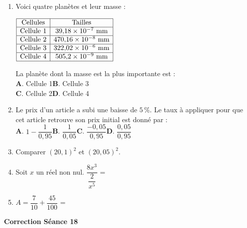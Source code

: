 \documentclass[a4paper,11pt]{article}
\begin{document}
\begin{seanceD}{} %

\begin{enumerate}
\item Voici quatre planètes et leur masse : \\
\begin{minipage}[c]{0.4\textwidth}
$\renewcommand{\arraystretch}{1}
\begin{array}{|c|c|}
\hline
 \text{Cellules} & \text{Tailles}\\
\hline
 \text{Cellule 1} & 39{,}18\times 10^{-7}\text{ mm}\\
\hline
\text{Cellule 2} & 470{,}16\times 10^{-8}\text{ mm}\\
\hline
\text{Cellule 3} & 322{,}02\times 10^{-6}\text{ mm}\\
\hline
\text{Cellule 4} & 505{,}2\times 10^{-9}\text{ mm}\\
\hline
 \end{array}
\renewcommand{\arraystretch}{1}$
\end{minipage} \hfill  \begin{minipage}[c]{0.6\textwidth}
La planète dont la masse est la plus importante est : \\
\textbf{A}. Cellule 1\qquad \textbf{B}. Cellule 3\\
\textbf{C}. Cellule 2\qquad \textbf{D}. Cellule 4\qquad 

\end{minipage}
\item Le prix d’un article a subi une baisse de $5\,\%$. Le taux à appliquer pour que cet article retrouve son prix initial est donné par  :\\
\textbf{A}. $1-\dfrac{1}{0{,}95}$\qquad \textbf{B}. $\dfrac{1}{0{,}05}$\qquad \textbf{C}. $\dfrac{-0{,}05}{0{,}95}$\qquad \textbf{D}. $\dfrac{0{,}05}{0{,}95}$\qquad 



\item Comparer  $(20{,}1)^2$ et $(20,05)^2$.
\item Soit $x$ un réel non nul. $\dfrac{8x^{3}}{\dfrac{2}{x^5}}$ = \dotfill


\item $A=\dfrac{7}{10}+\dfrac{45}{100}$ = \dotfill

\end{enumerate}

\end{seanceD}

\vspace{0.5cm}
\begin{center}

\textbf{\textcolor{Couleur8}{Correction Séance 18}}\\
\vspace{2mm}

\end{center}
\end{document}
